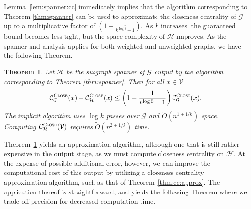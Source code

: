 \documentclass{report}
\newtheorem{theorem}{Theorem}[section]
\newcommand{\algoname}[1]{\textnormal{\textsc{#1}}}
\begin{document}
Lemma~\ref{lem:spanner:cc} immediately implies that the algorithm corresponding to Theorem \ref{thm:spanner} can be used to approximate the closeness centrality of $\mathcal{G}$ up to a multiplicative factor of $\left ( 1- \frac{1}{k^{\log 5} - 1} \right )$.
As $k$ increases, the guaranteed bound becomes less tight, but the space complexity of $\mathcal{H}$ improves. 
As the spanner and analysis applies for both weighted and unweighted graphs, we have the following Theorem.

%
\begin{theorem} \label{thm:cc:sstream:approx:heavy}
Let $\mathcal{H}$ be the subgraph spanner of $\mathcal{G}$ output by the algorithm corresponding to Theorem \ref{thm:spanner}.
Then for all $x \in \mathcal{V}$
%
\begin{equation} \label{eq:spanner:cc:heavy}
\mathcal{C}^{\algoname{Close}}_{\mathcal{G}}(x) - \mathcal{C}^{\algoname{Close}}_{\mathcal{H}}(x) \leq \left ( 1 - \frac{1}{k^{\log 5} - 1} \right ) \mathcal{C}^{\algoname{Close}}_{\mathcal{G}}(x).
\end{equation}
%
The implicit algorithm uses $\log k$ passes over $\mathcal{G}$ and $\widetilde{O}(n^{1 + 1/k})$ space.
Computing $\mathcal{C}^{\algoname{Close}}_{\mathcal{H}}(\mathcal{V})$ requires $\widetilde{O}(n^{2 + 1/k})$ time.
\end{theorem}




Theorem~\ref{thm:cc:sstream:approx:heavy} yields an approximation algorithm, although one that is still rather expensive in the output stage, as we must compute closeness centrality on $\mathcal{H}$. 
At the expense of possible additional error, however, we can improve the computational cost of this output by utilizing a closeness centrality approximation algorithm, such as that of Theorem~\ref{thm:cc:approx}.
The application thereof is straightforward, and yields the following Theorem where we trade off precision for decreased computation time.
\end{document}

